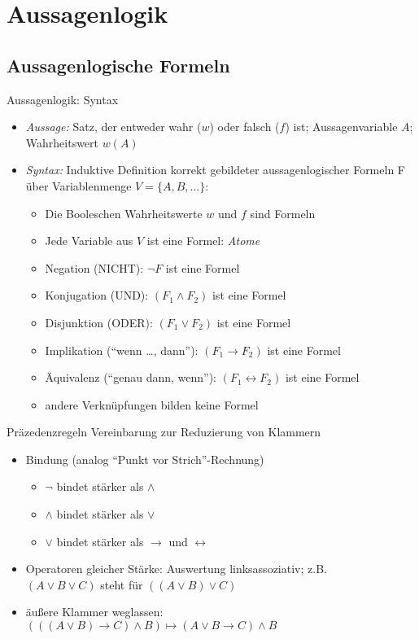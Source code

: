 \section{Aussagenlogik}

\subsection{Aussagenlogische Formeln}

\begin{frame}{Aussagenlogik: Syntax}
	\begin{itemize}
		\item \emph{Aussage:} Satz, der entweder wahr ($w$) oder falsch ($f$) ist; Aussagenvariable $A$; Wahrheitswert $w(A)$
		\item \emph{Syntax:} Induktive Definition korrekt gebildeter aussagenlogischer Formeln F über Variablenmenge $V=\{A, B, \ldots\}$:
		\begin{itemize}
			\item Die Booleschen Wahrheitswerte $w$ und $f$ sind Formeln
			\item Jede Variable aus $V$ ist eine Formel: \emph{Atome}
			\item Negation (NICHT): $\neg F$ ist eine Formel
			\item Konjugation (UND): $(F_1 \land F_2)$ ist eine Formel
			\item Disjunktion (ODER): $(F_1 \lor F_2)$ ist eine Formel
			\item Implikation ("`wenn \ldots, dann"'): $(F_1 \rightarrow F_2)$ ist eine Formel
			\item Äquivalenz ("`genau dann, wenn"'): $(F_1 \leftrightarrow F_2)$ ist eine Formel
			\item andere Verknüpfungen bilden keine Formel
		\end{itemize}
	\end{itemize}
\end{frame}

\begin{frame}{Präzedenzregeln}
	Vereinbarung zur Reduzierung von Klammern
	\begin{itemize}
		\item Bindung (analog "`Punkt vor Strich"'-Rechnung)
		\begin{itemize}
			\item $\neg$ bindet stärker als $\land$
			\item $\land$ bindet stärker als $\lor$
			\item $\lor$ bindet stärker als $\rightarrow$ und $\leftrightarrow$
		\end{itemize}
		\item Operatoren gleicher Stärke: Auswertung linksassoziativ; z.B. \\ $(A \lor B \lor C)$ steht für $((A \lor B) \lor C)$
		\item äußere Klammer weglassen: $(((A \lor B) \rightarrow C) \land B) \mapsto (A \lor B \rightarrow C) \land B$
	\end{itemize}
\end{frame}

